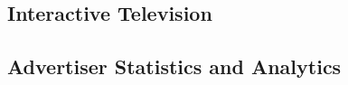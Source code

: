 \subsection{Interactive Television}

	\citep{integrated-approach-advertising}


\subsection{Advertiser Statistics and Analytics}
